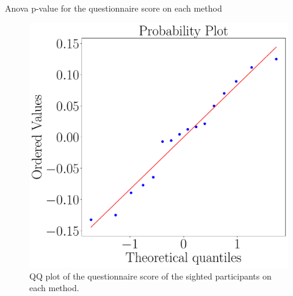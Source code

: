 \begin{table}[!htb]
    \caption{Anova p-value for the questionnaire score on each method}
    \label{tab:blocanova_questionnaire_blind_sight}
\begin{minipage}{0.45\textwidth}
    
\end{minipage}
\begin{minipage}{0.45\textwidth}
    
\end{minipage}
\end{table}

\begin{figure}[!htb]
    \centering
    \begin{minipage}{0.45\textwidth}
        \centering
        \includegraphics[width = \textwidth]{Resultados/Questionario/Figuras/pdf/qqplot_questionnaire_sight.pdf}
        \caption{QQ plot of the questionnaire score of the sighted participants on each method.}
        \label{fig:qqplot_questionnaire_sight}
    \end{minipage}
    \begin{minipage}{0.075\textwidth}
        \hfill
    \end{minipage}

\end{figure}
